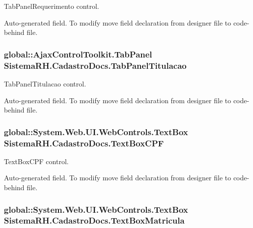 TabPanelRequerimento control. 

Auto-\/generated field. To modify move field declaration from designer file to code-\/behind file. \hypertarget{class_sistema_r_h_1_1_cadastro_docs_a6584da713de60909f4ffaf2129db77ea}{
\subsubsection[{TabPanelTitulacao}]{\setlength{\rightskip}{0pt plus 5cm}global::AjaxControlToolkit.TabPanel {\bf SistemaRH.CadastroDocs.TabPanelTitulacao}}}
\label{class_sistema_r_h_1_1_cadastro_docs_a6584da713de60909f4ffaf2129db77ea}


TabPanelTitulacao control. 

Auto-\/generated field. To modify move field declaration from designer file to code-\/behind file. \hypertarget{class_sistema_r_h_1_1_cadastro_docs_a74b78098bf3b6eb0cfafde04d71d0b35}{
\subsubsection[{TextBoxCPF}]{\setlength{\rightskip}{0pt plus 5cm}global::System.Web.UI.WebControls.TextBox {\bf SistemaRH.CadastroDocs.TextBoxCPF}}}
\label{class_sistema_r_h_1_1_cadastro_docs_a74b78098bf3b6eb0cfafde04d71d0b35}


TextBoxCPF control. 

Auto-\/generated field. To modify move field declaration from designer file to code-\/behind file. \hypertarget{class_sistema_r_h_1_1_cadastro_docs_a1a75e3c9e88df9078ea5070b6f6c6beb}{
\subsubsection[{TextBoxMatricula}]{\setlength{\rightskip}{0pt plus 5cm}global::System.Web.UI.WebControls.TextBox {\bf SistemaRH.CadastroDocs.TextBoxMatricula}}}
\label{class_sistema_r_h_1_1_cadastro_docs_a1a75e3c9e88df9078ea5070b6f6c6beb}


